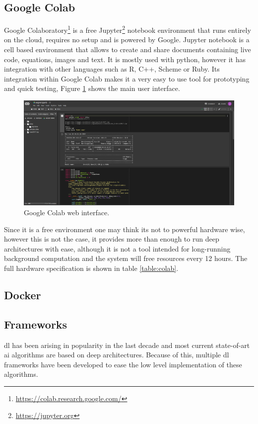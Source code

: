 \subsection{Google Colab}
\label{sec:colab}
Google Colaboratory\footnote{\url{https://colab.research.google.com/}} is a free Jupyter\footnote{\url{https://jupyter.org}} notebook environment that runs entirely on the cloud, requires no setup and is powered by Google. Jupyter notebook is a cell based environment that allows to create and share documents containing live code\texttt{}, equations, images and text. It is mostly used with python, however it has integration with other languages such as R, C++, Scheme or Ruby. Its integration within Google Colab makes it a very easy to use tool for prototyping and quick testing, Figure \ref{fig:colab} shows the main user interface.

\begin{figure}
	\centering
	\includegraphics[width=0.8\linewidth]{archivos/colab}
	\caption{Google Colab web interface.}
	\label{fig:colab}
\end{figure}

Since it is a free environment one may think its not to powerful hardware wise, however this is not the case, it provides more than enough to run deep architectures with ease, although it is not a tool intended for long-running background computation and the system will free resources every 12 hours.
The full hardware specification is shown in table \ref{table:colab}.

\subsection{Docker}

\subsection{Frameworks}
\gls{dl} has been arising in popularity in the last decade and most current state-of-art \gls{ai} algorithms are based on deep architectures. Because of this, multiple \gls{dl} frameworks have been developed to ease the low level implementation of these algorithms.

